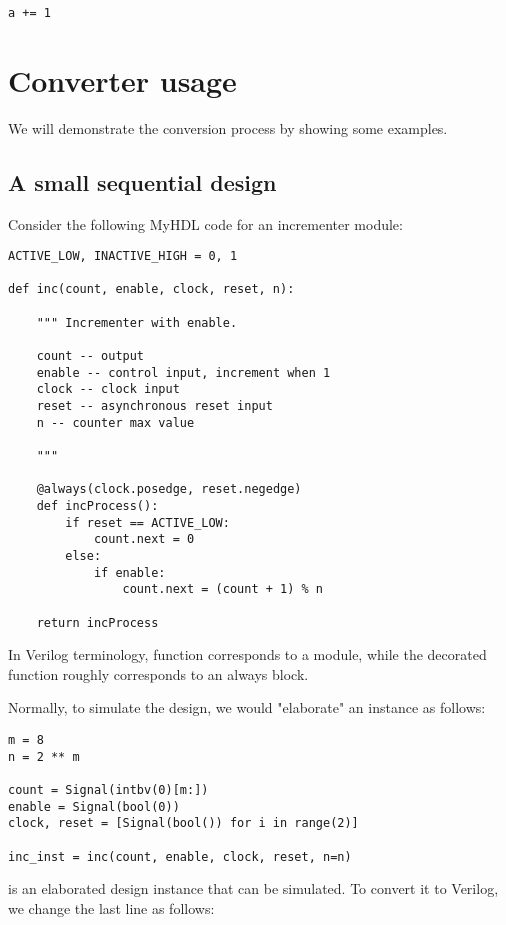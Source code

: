 \begin{verbatim}
a += 1
\end{verbatim}

\section{Converter usage\label{conv-usage}}

We will demonstrate the conversion process by showing some examples.

\subsection{A small sequential design\label{conv-usage-seq}}

Consider the following MyHDL code for an incrementer module:

\begin{verbatim}
ACTIVE_LOW, INACTIVE_HIGH = 0, 1

def inc(count, enable, clock, reset, n):
    
    """ Incrementer with enable.
    
    count -- output
    enable -- control input, increment when 1
    clock -- clock input
    reset -- asynchronous reset input
    n -- counter max value
    
    """
    
    @always(clock.posedge, reset.negedge)
    def incProcess():
        if reset == ACTIVE_LOW:
            count.next = 0
        else:
            if enable:
                count.next = (count + 1) % n
                
    return incProcess
\end{verbatim}

In Verilog terminology, function  corresponds to a
module, while the decorated function 
roughly corresponds to an always block.

Normally, to simulate the design, we would "elaborate" an instance
as follows:

\begin{verbatim}
m = 8
n = 2 ** m
 
count = Signal(intbv(0)[m:])
enable = Signal(bool(0))
clock, reset = [Signal(bool()) for i in range(2)]

inc_inst = inc(count, enable, clock, reset, n=n)
\end{verbatim}

 is an elaborated design instance that can be simulated. To
convert it to Verilog, we change the last line as follows:

